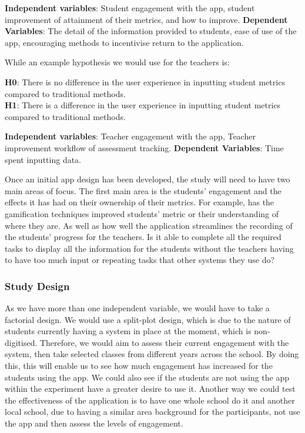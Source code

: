 \documentclass{sigchi}
\begin{document}
\textbf{Independent variables}: Student engagement with the app, student improvement of attainment of their metrics, and how to improve.
\textbf{Dependent Variables}: The detail of the information provided to students, ease of use of the app, encouraging methods to incentivise return to the application.

While an  example hypothesis we would use for the teachers is:

\textbf{H0}: There is no difference in the user experience in inputting student metrics compared to traditional methods.\\
\textbf{H1}: There is a difference in the user experience in inputting student metrics compared to traditional methods.

\textbf{Independent variables}: Teacher engagement with the app, Teacher improvement workflow of assessment tracking.
\textbf{Dependent Variables}: Time spent inputting data.

Once an initial app design has been developed, the study will need to have two main areas of focus. The first main area is the students' engagement and the effects it has had on their ownership of their metrics. For example, has the gamification techniques improved students' metric or their understanding of where they are. As well as how well the application streamlines the recording of the students' progress for the teachers. Is it able to complete all the required tasks to display all the information for the students without the teachers having to have too much input or repeating tasks that other systems they use do?

\subsubsection{Study Design}
As we have more than one independent variable, we would have to take a factorial design. We would use a split-plot design, which is due to the nature of students currently having a system in place at the moment, which is non-digitised. Therefore, we would aim to assess their current engagement with the system, then take selected classes from different years across the school. By doing this, this will enable us to see how much engagement has increased for the students using the app. We could also see if the students are not using the app within the experiment have a greater desire to use it. Another way we could test the effectiveness of the application is to have one whole school do it and another local school, due to having a similar area background for the participants, not use the app and then assess the levels of engagement.
\end{document}
